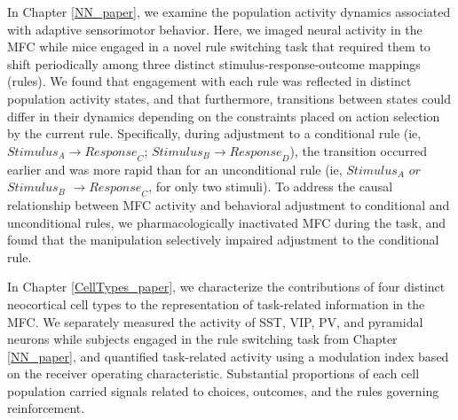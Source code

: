 In Chapter \ref{NN_paper}, we examine the population activity dynamics associated with adaptive sensorimotor behavior. Here, we imaged neural activity in the MFC while mice engaged in a novel rule switching task that required them to shift periodically among three distinct stimulus-response-outcome mappings (rules). We found that engagement with each rule was reflected in distinct population activity states, and that furthermore, transitions between states could differ in their dynamics depending on the constraints placed on action selection by the current rule. Specifically, during adjustment to a conditional rule (ie, $\mathit{Stimulus}_A \to \mathit{Response}_C$; $\mathit{Stimulus}_B \to \mathit{Response}_D$), the transition occurred earlier and was more rapid than for an unconditional rule (ie, $\mathit{Stimulus}_A$ $\mathit{or}$ $\mathit{Stimulus}_B$ $\to \mathit{Response}_C$, for only two stimuli). To address the causal relationship between MFC activity and behavioral adjustment to conditional and unconditional rules, we pharmacologically inactivated MFC during the task, and found that the manipulation selectively impaired adjustment to the conditional rule.

In Chapter \ref{CellTypes_paper}, we characterize the contributions of four distinct neocortical cell types to the representation of task-related information in the MFC. We separately measured the activity of SST, VIP, PV, and pyramidal neurons while subjects engaged in the rule switching task from Chapter \ref{NN_paper}, and quantified task-related activity using a modulation index based on the receiver operating characteristic. Substantial proportions of each cell population carried signals related to choices, outcomes, and the rules governing reinforcement.
